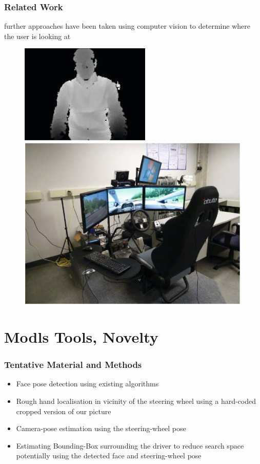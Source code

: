 \documentclass{beamer}
\begin{document}
	
	\begin{frame}
		\frametitle{Related Work}
		further approaches have been taken using computer vision to determine where the user is looking at 
		
		
		\begin{figure}
			\includegraphics{RanFor}
			\includegraphics[scale = .365]{RanForSim}
		\end{figure}
		\begin{figure}
			
			
			
		\end{figure}
	\end{frame}
	
	\section{Modls Tools, Novelty}	
	\begin{frame}
		\frametitle{Tentative Material and Methods}
        \begin{itemize}
            \item 
                Face pose detection using existing algorithms
            \item
                Rough hand localisation in vicinity of the steering wheel using a hard-coded cropped version of our picture
            \item
                Camera-pose estimation using the steering-wheel pose
            \item
                Estimating Bounding-Box surrounding the driver to reduce search space potentially using the detected face and steering-wheel pose
        \end{itemize}
	\end{frame}	
\end{document}

